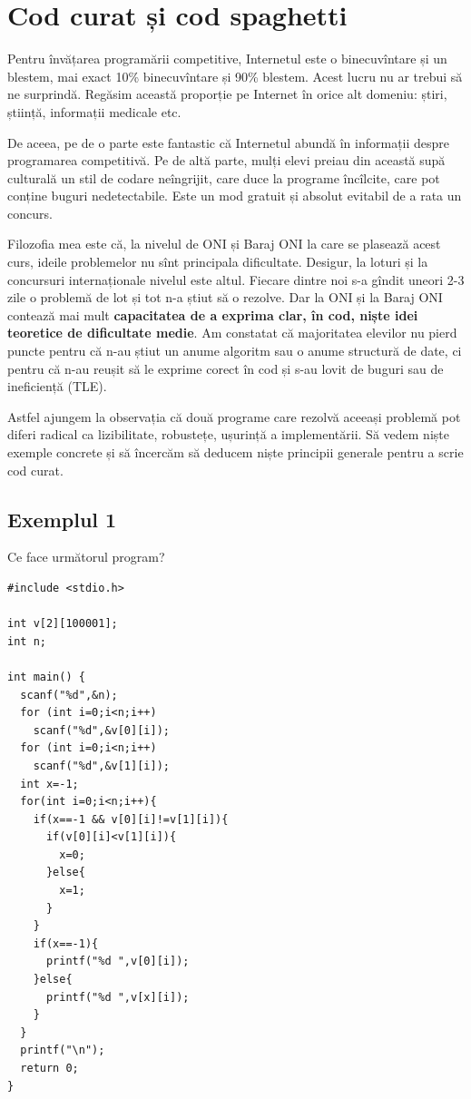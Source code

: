 \documentclass[../main.tex]{subfiles}
\begin{document}
\chapter{Cod curat și cod spaghetti}

Pentru învățarea programării competitive, Internetul este o binecuvîntare și un blestem, mai exact 10\% binecuvîntare și 90\% blestem. Acest lucru nu ar trebui să ne surprindă. Regăsim această proporție pe Internet în orice alt domeniu: știri, știință, informații medicale etc.

De aceea, pe de o parte este fantastic că Internetul abundă în informații despre programarea competitivă. Pe de altă parte, mulți elevi preiau din această supă culturală un stil de codare neîngrijit, care duce la programe încîlcite, care pot conține buguri nedetectabile. Este un mod gratuit și absolut evitabil de a rata un concurs.

Filozofia mea este că, la nivelul de ONI și Baraj ONI la care se plasează acest curs, ideile problemelor nu sînt principala dificultate. Desigur, la loturi și la concursuri internaționale nivelul este altul. Fiecare dintre noi s-a gîndit uneori 2-3 zile o problemă de lot și tot n-a știut să o rezolve. Dar la ONI și la Baraj ONI contează mai mult \textbf{capacitatea de a exprima clar, în cod, niște idei teoretice de dificultate medie}. Am constatat că majoritatea elevilor nu pierd puncte pentru că n-au știut un anume algoritm sau o anume structură de date, ci pentru că n-au reușit să le exprime corect în cod și s-au lovit de buguri sau de ineficiență (TLE).

Astfel ajungem la observația că două programe care rezolvă aceeași problemă pot diferi radical ca lizibilitate, robustețe, ușurință a implementării. Să vedem niște exemple concrete și să încercăm să deducem niște principii generale pentru a scrie cod curat.

\section{Exemplul 1}

Ce face următorul program?

\begin{verbatim}
#include <stdio.h>

int v[2][100001];
int n;

int main() {
  scanf("%d",&n);
  for (int i=0;i<n;i++)
    scanf("%d",&v[0][i]);
  for (int i=0;i<n;i++)
    scanf("%d",&v[1][i]);
  int x=-1;
  for(int i=0;i<n;i++){
    if(x==-1 && v[0][i]!=v[1][i]){
      if(v[0][i]<v[1][i]){
        x=0;
      }else{
        x=1;
      }
    }
    if(x==-1){
      printf("%d ",v[0][i]);
    }else{
      printf("%d ",v[x][i]);
    }
  }
  printf("\n");
  return 0;
}
\end{verbatim}
\end{document}
